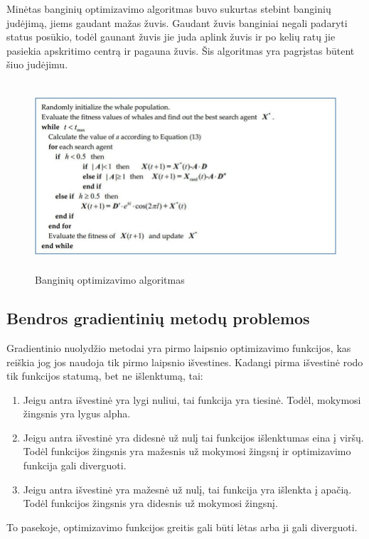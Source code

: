 \documentclass{VUMIFInfKursinis}
\begin{document}
\par
Minėtas banginių optimizavimo algoritmas buvo sukurtas stebint banginių judėjimą, jiems gaudant mažas žuvis. Gaudant žuvis banginiai negali
padaryti status posūkio, todėl gaunant žuvis jie juda aplink žuvis ir po kelių ratų jie pasiekia apskritimo
centrą ir pagauna žuvis. Šis algoritmas yra pagrįstas būtent šiuo judėjimu. \cite{salt10}
\begin{figure}[ht]
  \includegraphics[width=12cm,height=7cm,keepaspectratio]{what_alg.png}
  \caption{Banginių optimizavimo algoritmas \cite{salt10}}
  \label{fig:lygtis1}
\end{figure}







\subsection{Bendros gradientinių metodų problemos}
\par
Gradientinio nuolydžio metodai yra pirmo laipsnio optimizavimo funkcijos, kas
reiškia jog jos naudoja tik pirmo laipsnio išvestines. Kadangi pirma išvestinė rodo
tik funkcijos statumą, bet ne išlenktumą, tai:
\begin{enumerate}
\item Jeigu antra išvestinė yra lygi nuliui, tai funkcija yra tiesinė. Todėl,
mokymosi žingsnis yra lygus alpha. \cite{salt9}
\item Jeigu antra išvestinė yra didesnė už nulį tai funkcijos išlenktumas eina į viršų.
Todėl funkcijos žingsnis yra mažesnis už mokymosi žingsnį ir optimizavimo funkcija gali
diverguoti. \cite{salt9}
\item Jeigu antra išvestinė yra mažesnė už nulį, tai funkcija yra išlenkta į apačią.
Todėl funkcijos žingsnis yra didesnis už mokymosi žingsnį. \cite{salt9}
\end{enumerate}
\par
To pasekoje, optimizavimo funkcijos greitis gali būti lėtas arba ji gali diverguoti.
\end{document}
